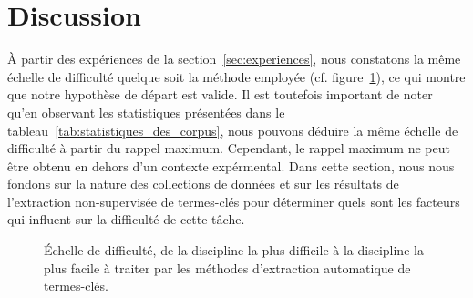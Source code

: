 \section{Discussion}
\label{sec:discussion}
  À partir des expériences de la section~\ref{sec:experiences},
  nous constatons la même échelle de difficulté quelque soit la méthode
  employée (cf. figure~\ref{fig:echelle}), ce qui montre que notre hypothèse de
  départ est valide. Il est toutefois important de noter qu'en observant les
  statistiques présentées dans le tableau~\ref{tab:statistiques_des_corpus},
  nous pouvons déduire la même échelle de difficulté à partir du rappel maximum.
  Cependant, le rappel maximum ne peut être obtenu en dehors d'un contexte
  expérmental. Dans cette section, nous nous fondons sur la nature des
  collections de données et sur les résultats de l'extraction non-supervisée de
  termes-clés pour déterminer quels sont les facteurs qui influent sur la
  difficulté de cette tâche.
  \begin{figure}
    \centering
    \caption{Échelle de difficulté, de la discipline la plus difficile à la
             discipline la plus facile à traiter par les méthodes d'extraction
             automatique de termes-clés.
             \label{fig:echelle}}
  \end{figure}

